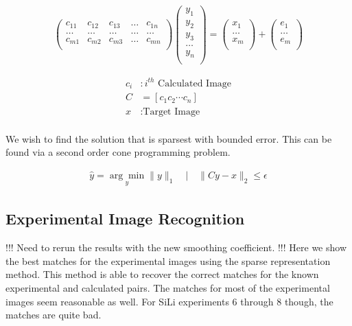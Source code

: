 \documentclass[12pt,letterpaper]{article}
\begin{document}
\begin{align*}
\left(\begin{array}{ccccc}
c_{11} & c_{12} & c_{13} & \ldots & c_{1n} \\
\ldots & \ldots & \ldots & \ldots & \ldots \\
c_{m1} & c_{m2} & c_{m3} & \ldots & c_{mn} \\
\end{array}\right)
\left(\begin{array}{c}
y_1\\
y_2\\
y_3\\
\ldots\\
y_n\\
\end{array}
\right)
= \left(\begin{array}{c}
x_1\\
\ldots\\
x_m\\
\end{array}
\right)
+
\left(\begin{array}{c}
e_1\\
\ldots\\
e_m\\
\end{array}
\right)
\end{align*}

\begin{align*}
c_i&: i^{th} \mbox{ Calculated Image} \\
C &= [c_1 c_2 \cdots c_n] \\
x&: \mbox{Target Image}\\
\end{align*}

We wish to find the solution that is sparsest with bounded error. This can be
found via a second order cone programming problem.

\begin{align*}
\hat{y} = \underset{y}{\arg\min} \| y \|_1 \hspace{1em}|\hspace{1em} \|Cy - x\|_2 \leq \epsilon
\end{align*}

\subsection{Experimental Image Recognition}
!!! Need to rerun the results with the new smoothing coefficient. !!!
Here we show the best matches for the experimental images using the sparse
representation method. This method is able to recover the correct matches for
the known experimental and calculated pairs. The matches for most of the
experimental images seem reasonable as well. For SiLi experiments 6 through 8
though, the matches are quite bad.
\end{document}
